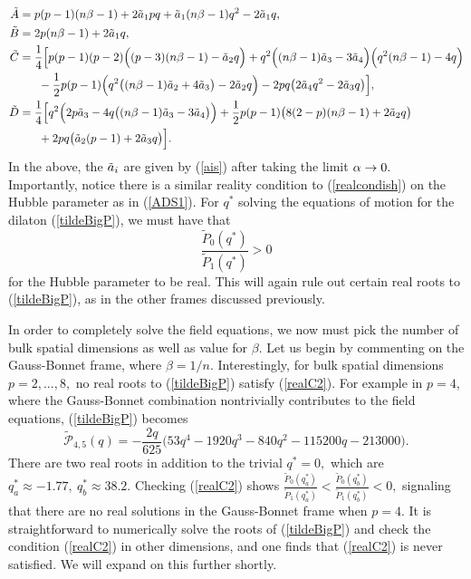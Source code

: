 \documentclass[amsmath,amssymb,11pt]{article}
\begin{document}
\begin{equation}
\begin{split}
\tilde{A} &= p(p-1)(n\beta-1)+2\ta_1pq+\ta_1(n\beta-1)q^2-2\ta_1 q, \\
\tilde{B}&= 2p(n\beta-1)+2\ta_1q, \\
\tilde{C}&= \frac{1}{4}\Big[p(p-1)(p-2)\Big((p-3)(n\beta-1)-\ta_2 q\Big)+q^2\Big((n\beta-1)\ta_3-3\ta_4\Big)\Big(q^2(n\beta-1)-4q\Big) \\
& \ \ \ \ \ -\frac{1}{2}p(p-1)\Big(q^2\big((n\beta-1)\ta_2+4\ta_3\big)-2\ta_2 q\Big) -2pq\big(2\ta_4 q^2-2\ta_3 q\big)\Big], \\
\tilde{D} &=\frac{1}{4}\Big[ q^2\Big(2p\ta_3-4q\big((n\beta-1)\ta_3-3\ta_4\big)\Big)+\frac{1}{2}p(p-1)\big(8(2-p)(n\beta-1)+2\ta_2 q\big) \\
& \ \ \ \ \ +2pq\big(\ta_2(p-1)+2\ta_3 q\big)\Big].
\end{split}
\end{equation}
In the above, the $\tilde{a}_i$ are given by (\ref{ais}) after taking the limit $\alpha\rightarrow 0.$ Importantly, notice there is a similar reality condition to (\ref{realcondish}) on the Hubble parameter as in (\ref{ADS1}). For $q^*$ solving the equations of motion for the dilaton (\ref{tildeBigP}), we must have that 
\begin{equation}\label{realC2}
\frac{\tilde{P}_0(q^*)}{\tilde{P}_1(q^*)} > 0
\end{equation}
for the Hubble parameter to be real. This will again rule out certain real roots to (\ref{tildeBigP}), as in the other frames discussed previously.





In order to completely solve the field equations, we now must pick the number of bulk spatial dimensions as well as value for $\beta$. Let us begin by commenting on the Gauss-Bonnet frame, where $\beta=1/n.$ Interestingly, for bulk spatial dimensions $p=2,...,8,$ no real roots to (\ref{tildeBigP}) satisfy (\ref{realC2}). For example in $p=4$, where the Gauss-Bonnet combination nontrivially contributes to the field equations, (\ref{tildeBigP}) becomes
\begin{equation}
\tilde{\mathcal{P}}_{4,5}(q) = -\frac{2q}{625}\big(53 q^4-1920 q^3-840 q^2-115200q-213000\big).
\end{equation}
There are two real roots in addition to the trivial $q^*=0,$ which are $q^*_a\approx -1.77, \  q^*_b\approx 38.2.$ Checking (\ref{realC2}) shows $\frac{\tilde{P}_0(q_a^*)}{\tilde{P}_1(q_a^*)}<\frac{\tilde{P}_0(q_b^*)}{\tilde{P}_1(q_b^*)} <0,$ signaling that there are no real solutions in the Gauss-Bonnet frame when $p=4.$ It is straightforward to numerically solve the roots of (\ref{tildeBigP}) and check the condition (\ref{realC2}) in other dimensions, and one finds that (\ref{realC2}) is never satisfied. We will expand on this further shortly.
\end{document}
